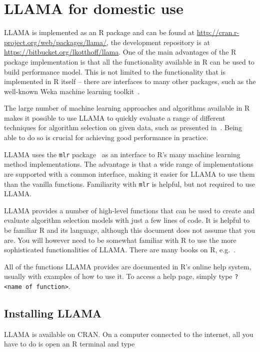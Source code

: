 \documentclass{article}\usepackage[]{graphicx}\usepackage[]{color}
\begin{document}
\section{LLAMA for domestic use}

LLAMA is implemented as an R package and can be found at
\url{http://cran.r-project.org/web/packages/llama/}, the development repository
is at \url{https://bitbucket.org/lkotthoff/llama}. One of the main advantages of
the R package implementation is that all the functionality available in R
can be used to build performance model. This is not limited to the functionality
that is implemented in R itself -- there are interfaces to many other packages,
such as the well-known Weka machine learning toolkit~\cite{hall_weka_2009}.

The large number of machine learning approaches and algorithms available in R
makes it possible to use LLAMA to quickly evaluate a range of different
techniques for algorithm selection on given data, such as presented
in~\cite{kotthoff_evaluation_2012}. Being able to do so is crucial for achieving
good performance in practice.

LLAMA uses the \lstinline{mlr} package~\cite{mlr} as an interface to R's many
machine learning method implementations. The advantage is that a wide range of
implementations are supported with a common interface, making it easier for
LLAMA to use them than the vanilla functions. Familiarity with \lstinline{mlr}
is helpful, but not required to use LLAMA.

LLAMA provides a number of high-level functions that can be used to create
and evaluate algorithm selection models with just a few lines of code. It is
helpful to be familiar R and its language, although this document does not
assume that you are. You will however need to be somewhat familiar with R to use
the more sophisticated functionalities of LLAMA. There are many books on R,
e.g.~\cite{rbook}.

All of the functions LLAMA provides are documented in R's online help system,
usually with examples of how to use it. To access a help page, simply type
\lstinline{?<name of function>}.

\subsection{Installing LLAMA}

LLAMA is available on CRAN. On a computer connected to the internet, all you
have to do is open an R terminal and type
\end{document}
